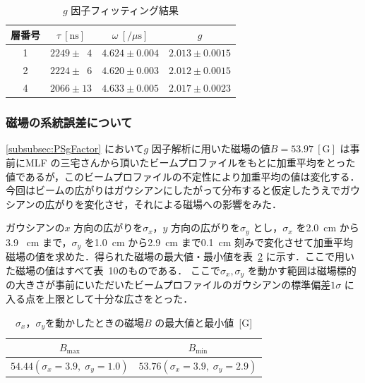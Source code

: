 \begin{table}[h]
	\centering
	\caption{$g$ 因子フィッティング結果}
	\begin{tabular}{cccc} \toprule
	層番号 & $\tau~[\mathrm{ns}]$ & $\omega~[/ \mu\mathrm{s}]$ & $g$ \\ \midrule
	1 & $2249 \pm \phantom{0}4$ & $4.624 \pm 0.004$ & $2.013 \pm 0.0015$ \\  
	2 & $2224 \pm \phantom{0}6$ & $4.620 \pm 0.003$ & $2.012 \pm 0.0015$ \\  
	4 & $2066 \pm 13$ & $4.633 \pm 0.005$ & $2.017 \pm 0.0023$ \\  \bottomrule
	\end{tabular}\label{tab:PSgFactor}
\end{table}%

\newpage

\subsubsection{磁場の系統誤差について}
\label{subsubsec:MagSysErr}

\ref{subsubsec:PSgFactor} において$g$ 因子解析に用いた磁場の値$B = 53.97~[\mathrm{G}]$ は事前にMLF の三宅さんから頂いたビームプロファイルをもとに加重平均をとった値であるが，このビームプロファイルの不定性により加重平均の値は変化する．
今回はビームの広がりはガウシアンにしたがって分布すると仮定したうえでガウシアンの広がりを変化させ，それによる磁場への影響をみた．

ガウシアンの$x$ 方向の広がりを$\sigma_{x}$，$y$ 方向の広がりを$\sigma_{y}$ とし，$\sigma_{x}$ を2.0~cm から3.9 ~cm まで，$\sigma_{y}$ を1.0~cm から2.9~cm まで0.1~cm 刻みで変化させて加重平均磁場の値を求めた．得られた磁場の最大値・最小値を表~\ref{tab:MagSysErr} に示す．ここで用いた磁場の値はすべて表~10のものである．
ここで$\sigma_{x}, \sigma_{y}$ を動かす範囲は磁場標的の大きさが事前にいただいたビームプロファイルのガウシアンの標準偏差$1\sigma$ に入る点を上限として十分な広さをとった．
\begin{table}[h]
	\centering
	\caption{$\sigma_{x}$，$\sigma_{y}$を動かしたときの磁場$B$ の最大値と最小値~[G]}
	\begin{tabular}{cc}\toprule
	$B_{\mathrm{max}}$ & $B_{\mathrm{min}}$ \\ \midrule
	$54.44 (\sigma_{x} = 3.9, \;\sigma_{y} = 1.0)$ & $53.76 (\sigma_{x} = 3.9, \;\sigma_{y} = 2.9)$ \\ \bottomrule 	
	\end{tabular}\label{tab:MagSysErr}
\end{table}%

